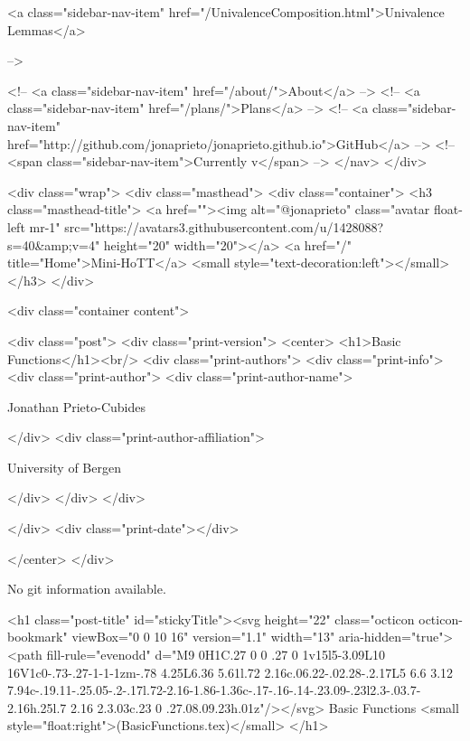       
    
      
        
          <a class="sidebar-nav-item" href="/UnivalenceComposition.html">Univalence Lemmas</a>
        
      
     -->

    <!-- <a class="sidebar-nav-item" href="/about/">About</a> -->
    <!-- <a class="sidebar-nav-item" href="/plans/">Plans</a> -->
    <!-- <a class="sidebar-nav-item" href="http://github.com/jonaprieto/jonaprieto.github.io">GitHub</a> -->
    <!-- <span class="sidebar-nav-item">Currently v</span> -->
  </nav>
</div>

    <div class="wrap">
      <div class="masthead">
        <div class="container">
          <h3 class="masthead-title">
            <a href=""><img alt="@jonaprieto" class="avatar float-left mr-1" src="https://avatars3.githubusercontent.com/u/1428088?s=40&amp;v=4" height="20" width="20"></a>
            <a href="/" title="Home">Mini-HoTT</a>
            <small style="text-decoration:left"></small>
          </h3>
        </div>
      
      <div class="container content">
        







<div class="post">
  <div class="print-version">
    <center>
      <h1>Basic Functions</h1><br/>
        <div class="print-authors">
          <div class="print-info">
            <div class="print-author">
              <div class="print-author-name">
                
                  Jonathan Prieto-Cubides
                
              </div>
              <div class="print-author-affiliation">
                
                  University of Bergen
                
                </div>
            </div>
          </div>
          
          
        </div>
        <div class="print-date"></div>
        
        
    </center>
  </div>

  
  No git information available.
  

  <h1 class="post-title" id="stickyTitle"><svg height="22" class="octicon octicon-bookmark" viewBox="0 0 10 16" version="1.1" width="13" aria-hidden="true"><path fill-rule="evenodd" d="M9 0H1C.27 0 0 .27 0 1v15l5-3.09L10 16V1c0-.73-.27-1-1-1zm-.78 4.25L6.36 5.61l.72 2.16c.06.22-.02.28-.2.17L5 6.6 3.12 7.94c-.19.11-.25.05-.2-.17l.72-2.16-1.86-1.36c-.17-.16-.14-.23.09-.23l2.3-.03.7-2.16h.25l.7 2.16 2.3.03c.23 0 .27.08.09.23h.01z"/></svg> Basic Functions <small style="float:right">(BasicFunctions.tex)</small>
  </h1>

